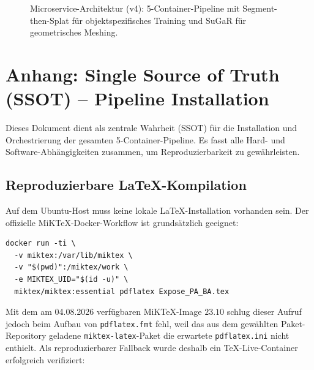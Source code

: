 \documentclass[12pt,a4paper]{article}
\begin{document}
\begin{figure}[H]
{
    }
    \caption{Microservice-Architektur (v4): 5-Container-Pipeline mit Segment-then-Splat für objektspezifisches Training und SuGaR für geometrisches Meshing.}
\end{figure}

\section{Anhang: Single Source of Truth (SSOT) -- Pipeline Installation}
Dieses Dokument dient als zentrale Wahrheit (SSOT) für die Installation und Orchestrierung der gesamten 5-Container-Pipeline. Es fasst alle Hard- und Software-Abhängigkeiten zusammen, um Reproduzierbarkeit zu gewährleisten.

\subsection*{Reproduzierbare LaTeX-Kompilation}
Auf dem Ubuntu-Host muss keine lokale LaTeX-Installation vorhanden sein. Der
offizielle MiKTeX-Docker-Workflow ist grundsätzlich geeignet:

\begin{verbatim}
docker run -ti \
  -v miktex:/var/lib/miktex \
  -v "$(pwd)":/miktex/work \
  -e MIKTEX_UID="$(id -u)" \
  miktex/miktex:essential pdflatex Expose_PA_BA.tex
\end{verbatim}

Mit dem am 04.08.2026 verfügbaren MiKTeX-Image $23.10$ schlug dieser Aufruf
jedoch beim Aufbau von \texttt{pdflatex.fmt} fehl, weil das aus dem gewählten
Paket-Repository geladene \texttt{miktex-latex}-Paket die erwartete
\texttt{pdflatex.ini} nicht enthielt. Als reproduzierbarer Fallback wurde
deshalb ein TeX-Live-Container erfolgreich verifiziert:
\end{document}
